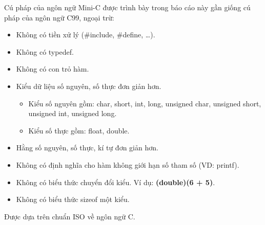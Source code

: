 \documentclass[../report.tex]{subfiles}
\begin{document}
Cú pháp của ngôn ngữ Mini-C được trình bày 
trong báo cáo này gần giống cú pháp của ngôn ngữ C99, ngoại trừ: 
\begin{itemize}
    \item Không có tiền xử lý (\#include, \#define, \ldots).
    \item Không có typedef. 
    \item Không có con trỏ hàm. 
    \item Kiểu dữ liệu số nguyên, số thực đơn giản hơn. 
        \begin{itemize}
        \item Kiểu số nguyên gồm: char, short, int, long, 
            unsigned char, unsigned short, 
            unsigned int, unsigned long.
        \item Kiểu số thực gồm:  float, double.
        \end{itemize}
    \item Hằng số nguyên, số thực, kí tự đơn giản hơn. 
    \item Không có định nghĩa cho 
        hàm không giới hạn số tham số (VD: printf). 
    \item Không có biểu thức chuyển đổi kiểu. Ví dụ: 
        \textbf{(double)(6 + 5)}.
    \item Không có biểu thức sizeof một kiểu.
\end{itemize}
Được dựa trên chuẩn ISO về ngôn ngữ C. \cite{iso}
\end{document}
